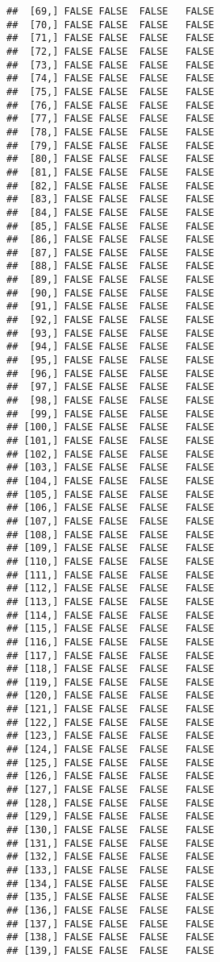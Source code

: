 \documentclass[
]{article}
\begin{document}
\begin{verbatim}
##  [69,] FALSE FALSE  FALSE   FALSE
##  [70,] FALSE FALSE  FALSE   FALSE
##  [71,] FALSE FALSE  FALSE   FALSE
##  [72,] FALSE FALSE  FALSE   FALSE
##  [73,] FALSE FALSE  FALSE   FALSE
##  [74,] FALSE FALSE  FALSE   FALSE
##  [75,] FALSE FALSE  FALSE   FALSE
##  [76,] FALSE FALSE  FALSE   FALSE
##  [77,] FALSE FALSE  FALSE   FALSE
##  [78,] FALSE FALSE  FALSE   FALSE
##  [79,] FALSE FALSE  FALSE   FALSE
##  [80,] FALSE FALSE  FALSE   FALSE
##  [81,] FALSE FALSE  FALSE   FALSE
##  [82,] FALSE FALSE  FALSE   FALSE
##  [83,] FALSE FALSE  FALSE   FALSE
##  [84,] FALSE FALSE  FALSE   FALSE
##  [85,] FALSE FALSE  FALSE   FALSE
##  [86,] FALSE FALSE  FALSE   FALSE
##  [87,] FALSE FALSE  FALSE   FALSE
##  [88,] FALSE FALSE  FALSE   FALSE
##  [89,] FALSE FALSE  FALSE   FALSE
##  [90,] FALSE FALSE  FALSE   FALSE
##  [91,] FALSE FALSE  FALSE   FALSE
##  [92,] FALSE FALSE  FALSE   FALSE
##  [93,] FALSE FALSE  FALSE   FALSE
##  [94,] FALSE FALSE  FALSE   FALSE
##  [95,] FALSE FALSE  FALSE   FALSE
##  [96,] FALSE FALSE  FALSE   FALSE
##  [97,] FALSE FALSE  FALSE   FALSE
##  [98,] FALSE FALSE  FALSE   FALSE
##  [99,] FALSE FALSE  FALSE   FALSE
## [100,] FALSE FALSE  FALSE   FALSE
## [101,] FALSE FALSE  FALSE   FALSE
## [102,] FALSE FALSE  FALSE   FALSE
## [103,] FALSE FALSE  FALSE   FALSE
## [104,] FALSE FALSE  FALSE   FALSE
## [105,] FALSE FALSE  FALSE   FALSE
## [106,] FALSE FALSE  FALSE   FALSE
## [107,] FALSE FALSE  FALSE   FALSE
## [108,] FALSE FALSE  FALSE   FALSE
## [109,] FALSE FALSE  FALSE   FALSE
## [110,] FALSE FALSE  FALSE   FALSE
## [111,] FALSE FALSE  FALSE   FALSE
## [112,] FALSE FALSE  FALSE   FALSE
## [113,] FALSE FALSE  FALSE   FALSE
## [114,] FALSE FALSE  FALSE   FALSE
## [115,] FALSE FALSE  FALSE   FALSE
## [116,] FALSE FALSE  FALSE   FALSE
## [117,] FALSE FALSE  FALSE   FALSE
## [118,] FALSE FALSE  FALSE   FALSE
## [119,] FALSE FALSE  FALSE   FALSE
## [120,] FALSE FALSE  FALSE   FALSE
## [121,] FALSE FALSE  FALSE   FALSE
## [122,] FALSE FALSE  FALSE   FALSE
## [123,] FALSE FALSE  FALSE   FALSE
## [124,] FALSE FALSE  FALSE   FALSE
## [125,] FALSE FALSE  FALSE   FALSE
## [126,] FALSE FALSE  FALSE   FALSE
## [127,] FALSE FALSE  FALSE   FALSE
## [128,] FALSE FALSE  FALSE   FALSE
## [129,] FALSE FALSE  FALSE   FALSE
## [130,] FALSE FALSE  FALSE   FALSE
## [131,] FALSE FALSE  FALSE   FALSE
## [132,] FALSE FALSE  FALSE   FALSE
## [133,] FALSE FALSE  FALSE   FALSE
## [134,] FALSE FALSE  FALSE   FALSE
## [135,] FALSE FALSE  FALSE   FALSE
## [136,] FALSE FALSE  FALSE   FALSE
## [137,] FALSE FALSE  FALSE   FALSE
## [138,] FALSE FALSE  FALSE   FALSE
## [139,] FALSE FALSE  FALSE   FALSE

\end{verbatim}
\end{document}
